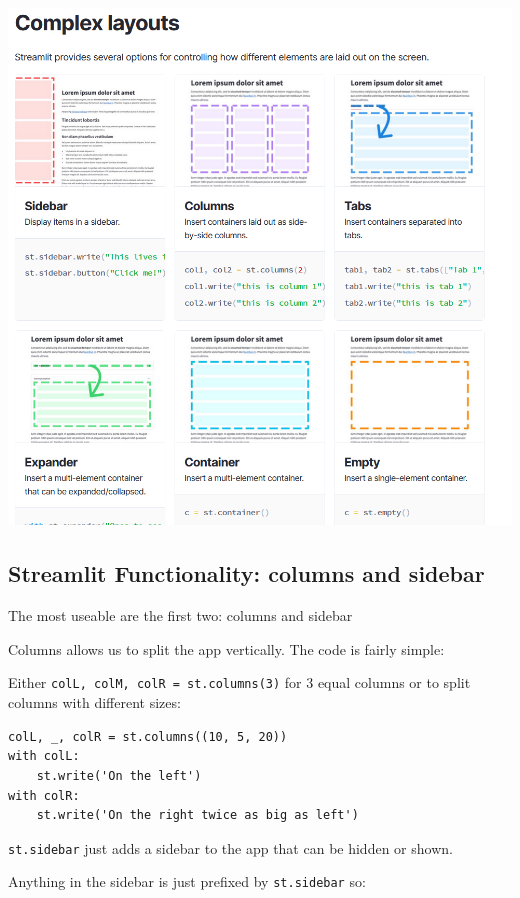 \documentclass[
  letterpaper,
  DIV=11,
  numbers=noendperiod]{scrartcl}
\begin{document}
\includegraphics{ghtop_images/streamlit_layout.png}

\hypertarget{streamlit-functionality-columns-and-sidebar}{%
\subsection{Streamlit Functionality: columns and
sidebar}\label{streamlit-functionality-columns-and-sidebar}}

The most useable are the first two: columns and sidebar

Columns allows us to split the app vertically. The code is fairly
simple:

Either \texttt{colL,\ colM,\ colR\ =\ st.columns(3)} for 3 equal columns
or to split columns with different sizes:

\begin{verbatim}
colL, _, colR = st.columns((10, 5, 20))
with colL:
    st.write('On the left')
with colR:
    st.write('On the right twice as big as left')
\end{verbatim}

\texttt{st.sidebar} just adds a sidebar to the app that can be hidden or
shown.

Anything in the sidebar is just prefixed by \texttt{st.sidebar} so:
\end{document}
